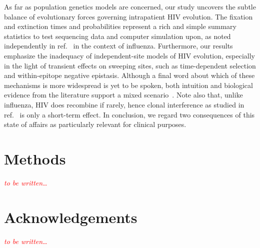 \documentclass[rmp, twocolumn]{revtex4}
\newcommand{\comment}[1]{\textit{\textcolor{red}{#1}}}
\begin{document}
As far as population genetics models are concerned, our study uncovers the
subtle balance of evolutionary forces governing intrapatient HIV evolution. The
fixation and extinction times and probabilities represent a rich and simple
summary statistics to test sequencing data and computer simulation upon, as
noted independently in ref.~\citep{strelkowa_clonal_2012} in the context of
influenza. Furthermore, our results emphasize the inadequacy of independent-site
models of HIV evolution, especially in the light of transient effects on
sweeping sites, such as time-dependent selection and within-epitope negative
epistasis. Although a final word about which of these mechanisms is more
widespread is yet to be spoken, both intuition and biological evidence from the
literature support a mixed scenario~\citep{richman_rapid_2003,
moore_limited_2009, bar_early_2012}. Note also that, unlike influenza, HIV does
recombine if rarely, hence clonal interference as studied in
ref.~\citep{strelkowa_clonal_2012} is only a short-term effect. In conclusion,
we regard two consequences of this state of affairs as particularly relevant for
clinical purposes.

\section{Methods}
\comment{to be written\dots}
\section*{Acknowledgements}
\comment{to be written\dots}




\end{document}
